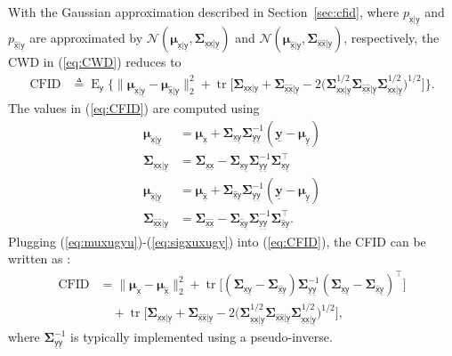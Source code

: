 \documentclass{article}
\theoremstyle{plain}
\theoremstyle{definition}
\theoremstyle{remark}
\renewcommand{\hat}{\widehat}
\newcommand{\defn}{\triangleq}
\newcommand{\uvec}[1]{\ensuremath{\underline{\boldsymbol{#1}}}}
\renewcommand{\vec}[1]{\ensuremath{\boldsymbol{#1}}}
\newcommand{\mc}[1]{\ensuremath{\mathcal{#1}}}
\newcommand{\tran}{^{\top}}
\DeclareMathOperator{\E}{E}
\DeclareMathOperator{\tr}{tr}
\renewcommand{\eqref}[1]{(\ref{eq:#1})}
\newcommand{\secref}[1]{Section~\ref{sec:#1}}
\newcommand{\Ey}{\E_{\mathsf{y}}}
\DeclareMathOperator{\CFID}{CFID}
\newcommand{\pxugyu}{p_{\underline{\mathsf{x}}|\underline{\mathsf{y}}}}
\newcommand{\pxuhgyu}{p_{\hat{\underline{\mathsf{x}}}|\underline{\mathsf{y}}}}
\newcommand{\muxu}{\vec{\mu}_{\underline{\mathsf{x}}}}
\newcommand{\muxhu}{\vec{\mu}_{\underline{\hat{\mathsf{x}}}}}
\newcommand{\muyu}{\vec{\mu}_{\underline{\mathsf{y}}}}
\newcommand{\muxugyu}{\vec{\mu}_{\underline{\mathsf{x}}|\underline{\mathsf{y}}}}
\newcommand{\muxhugyu}{\vec{\mu}_{\underline{\hat{\mathsf{x}}}|\underline{\mathsf{y}}}}
\newcommand{\Sigxugyu}{\vec{\Sigma}_{\underline{\mathsf{x}}\underline{\mathsf{x}}|\underline{\mathsf{y}}}}
\newcommand{\Sigxuhgyu}{\vec{\Sigma}_{\underline{\hat{\mathsf{x}}}\underline{\hat{\mathsf{x}}}|\underline{\mathsf{y}}}}
\newcommand{\Sigxuxu}{\vec{\Sigma}_{\underline{\mathsf{x}}\underline{\mathsf{x}}}}
\newcommand{\Sigxhuxhu}{\vec{\Sigma}_{\underline{\hat{\mathsf{x}}}\underline{\hat{\mathsf{x}}}}}
\newcommand{\Sigyuyu}{\vec{\Sigma}_{\underline{\mathsf{y}}\underline{\mathsf{y}}}}
\newcommand{\Sigxuyu}{\vec{\Sigma}_{\underline{\mathsf{x}}\underline{\mathsf{y}}}}
\newcommand{\Sigxhuyu}{\vec{\Sigma}_{\underline{\hat{\mathsf{x}}}\underline{\mathsf{y}}}}
\begin{document}
With the Gaussian approximation described in \secref{cfid}, where $\pxugyu$ and $\pxuhgyu$ are approximated by $\mc{N}(\muxugyu,\Sigxugyu)$ and $\mc{N}(\muxhugyu,\Sigxuhgyu)$, respectively, the CWD in \eqref{CWD} reduces to
\begin{align}
\CFID &\defn \Ey\big\{ \|\muxugyu-\muxhugyu\|_2^2  + \tr\big[ \Sigxugyu + \Sigxuhgyu - 2 \big( \Sigxugyu^{1/2} \Sigxuhgyu \Sigxugyu^{1/2} \big)^{1/2} \big]\big\}
\label{eq:CFID} .
\end{align}
The values in \eqref{CFID} are computed using 
\begin{align}
\muxugyu 
&= \muxu + \Sigxuyu\Sigyuyu^{-1}(\uvec{y}-\muyu)
\label{eq:muxugyu}\\
\Sigxugyu 
&= \Sigxuxu - \Sigxuyu\Sigyuyu^{-1}\Sigxuyu\tran
\label{eq:sigxxgy}\\
\muxhugyu 
&= \muxhu + \Sigxhuyu\Sigyuyu^{-1}(\uvec{y}-\muyu)\\
\Sigxuhgyu 
&= \Sigxhuxhu - \Sigxhuyu\Sigyuyu^{-1}\Sigxhuyu\tran
\label{eq:sigxuxugy}.
\end{align}
Plugging \eqref{muxugyu}-\eqref{sigxuxugy} into \eqref{CFID}, the CFID can be written as \cite[Lemma 2]{Soloveitchik:21}:
\begin{align}
\CFID 
&= \|\muxu-\muxhu\|_2^2 
+ \tr\Big[(\Sigxuyu - \Sigxhuyu)\Sigyuyu^{-1}(\Sigxuyu - \Sigxhuyu)\tran\Big] 
\nonumber\\&\quad
+ \tr\Big[\Sigxugyu + \Sigxuhgyu - 2 \big( \Sigxugyu^{1/2} \Sigxuhgyu \Sigxugyu^{1/2} \big)^{1/2}\Big] ,
\label{eq:CFID_2}
\end{align}
where $\Sigyuyu^{-1}$ is typically implemented using a pseudo-inverse.
\end{document}
